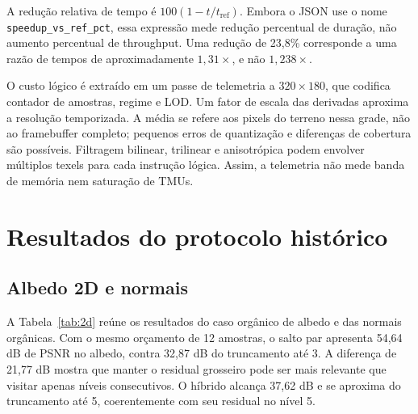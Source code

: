 A redução relativa de tempo é $100(1-t/t_{\mathrm{ref}})$. Embora o JSON use o nome \texttt{speedup\_vs\_ref\_pct}, essa expressão mede redução percentual de duração, não aumento percentual de throughput. Uma redução de 23,8\% corresponde a uma razão de tempos de aproximadamente $1{,}31\times$, e não $1{,}238\times$.

O custo lógico é extraído em um passe de telemetria a $320\times180$, que codifica contador de amostras, regime e LOD. Um fator de escala das derivadas aproxima a resolução temporizada. A média se refere aos pixels do terreno nessa grade, não ao framebuffer completo; pequenos erros de quantização e diferenças de cobertura são possíveis. Filtragem bilinear, trilinear e anisotrópica podem envolver múltiplos texels para cada instrução lógica. Assim, a telemetria não mede banda de memória nem saturação de TMUs.

\section{Resultados do protocolo histórico}
\subsection{Albedo 2D e normais}
A Tabela~\ref{tab:2d} reúne os resultados do caso orgânico de albedo e das normais orgânicas. Com o mesmo orçamento de 12 amostras, o salto par apresenta 54,64 dB de PSNR no albedo, contra 32,87 dB do truncamento até 3. A diferença de 21,77 dB mostra que manter o residual grosseiro pode ser mais relevante que visitar apenas níveis consecutivos. O híbrido alcança 37,62 dB e se aproxima do truncamento até 5, coerentemente com seu residual no nível 5.


